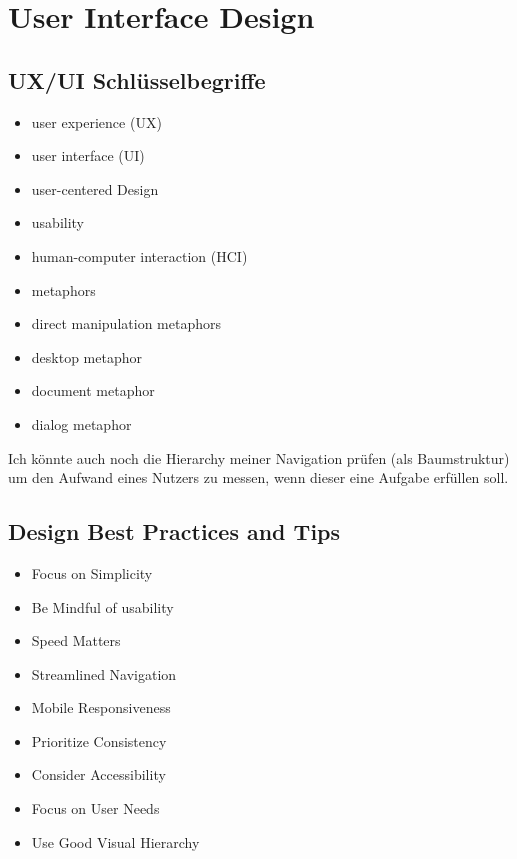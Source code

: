 \documentclass[a4paper]{article}
\title{\docTitle}
\author{Moritz}
\date{\today}
\begin{document}
\maketitle
\tableofcontents


\section{User Interface Design}

\subsection{UX/UI Schlüsselbegriffe}

\begin{itemize}
    \item user experience (UX)
    \item user interface (UI)
    \item user-centered Design
    \item usability
    \item human-computer interaction (HCI)
    \item metaphors
    \item direct manipulation metaphors
    \item desktop metaphor
    \item document metaphor
    \item dialog metaphor
\end{itemize}

Ich könnte auch noch die Hierarchy meiner Navigation prüfen (als Baumstruktur) um den Aufwand eines Nutzers zu messen, wenn dieser eine Aufgabe erfüllen soll.

\subsection{Design Best Practices and Tips}

\begin{itemize}
    \item Focus on Simplicity
    \item Be Mindful of usability
    \item Speed Matters
    \item Streamlined Navigation
    \item Mobile Responsiveness
    \item Prioritize Consistency
    \item Consider Accessibility
    \item Focus on User Needs
    \item Use Good Visual Hierarchy
\end{itemize}
\end{document}
